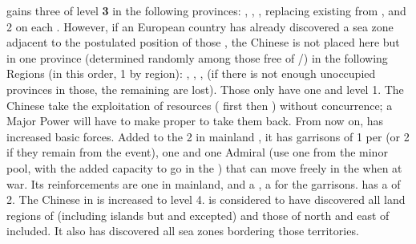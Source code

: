 \phevnt
\aparag \paysChine gains three \TP of level {\bf 3} in the following
provinces: \provinceCalicut, , \provinceMadras, replacing
existing \TP from \paysGujerat, and 2 \DT on each \TP.
\aparag However, if an European country has already discovered a sea zone
adjacent to the postulated position of those \TP, the Chinese \TP is not
placed here but in one province (determined randomly among those free of
\TP/\COL) in the following Regions (in this order, 1 by region):
\granderegionJava, \granderegionCelebes, \granderegionSumatra,
 (if there is not enough unoccupied provinces in
those, the remaining \TP are lost).  Those \TP only have one \DT and level 1.
\aparag The Chinese \TP take the exploitation of resources ( first then ) without concurrence; a Major Power will
have to make proper \CONC to take them back.
\aparag From now on, \paysChine has increased basic forces.  Added to the 2
\ARMY\faceplus in mainland \paysChine, it has garrisons of 1 \LD per \TP (or 2
\LD if they remain from the event), one \FLEET\faceplus and one Admiral (use
one from the minor pool, with the added capacity to go in the \ROTW) that can
move freely in the \ROTW when at war. Its reinforcements are one
\ARMY\faceplus in mainland, and a \LD, a \ND for the garrisons.
\aparag \paysChine has a \FTI of 2. The Chinese \TradeFLEET in 
is increased to level 4.
\aparag \paysChine is considered to have discovered all land regions of
\continentAsia (including islands but \granderegionOceania and
\granderegionPacifique excepted) and those of \continentAfrica north and east
of \granderegionNatal included. It also has discovered all sea zones bordering
those territories.









